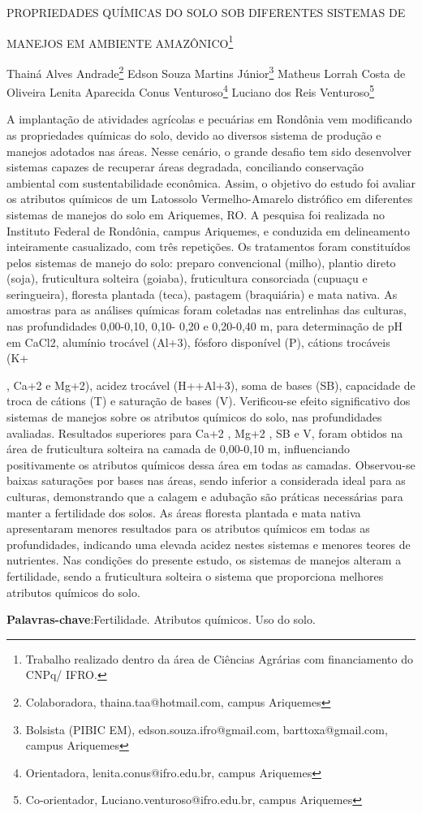 \documentclass[article,12pt,onesidea,4paper,english,brazil]{abntex2}
\begin{document}
	
	
	\frenchspacing 
	
	\begin{center}
		\LARGE PROPRIEDADES QUÍMICAS DO SOLO SOB DIFERENTES SISTEMAS DE
		
		MANEJOS EM AMBIENTE AMAZÔNICO\footnote{Trabalho realizado dentro da área de Ciências Agrárias com financiamento do CNPq/ IFRO.}
		
		\normalsize
		Thainá Alves Andrade\footnote{Colaboradora, thaina.taa@hotmail.com, campus Ariquemes} 
		Edson Souza Martins Júnior\footnote{Bolsista (PIBIC EM), edson.souza.ifro@gmail.com, barttoxa@gmail.com, campus Ariquemes} 
		Matheus Lorrah Costa de Oliveira 
		Lenita Aparecida Conus Venturoso\footnote{Orientadora, lenita.conus@ifro.edu.br, campus Ariquemes} 
		Luciano dos Reis Venturoso\footnote{Co-orientador, Luciano.venturoso@ifro.edu.br, campus Ariquemes}
	\end{center}
	
	\noindent A implantação de atividades agrícolas e pecuárias em Rondônia vem modificando as
	propriedades químicas do solo, devido ao diversos sistema de produção e manejos
	adotados nas áreas. Nesse cenário, o grande desafio tem sido desenvolver sistemas
	capazes de recuperar áreas degradada, conciliando conservação ambiental com
	sustentabilidade econômica. Assim, o objetivo do estudo foi avaliar os atributos
	químicos de um Latossolo Vermelho-Amarelo distrófico em diferentes sistemas de
	manejos do solo em Ariquemes, RO. A pesquisa foi realizada no Instituto Federal de
	Rondônia, campus Ariquemes, e conduzida em delineamento inteiramente
	casualizado, com três repetições. Os tratamentos foram constituídos pelos sistemas
	de manejo do solo: preparo convencional (milho), plantio direto (soja), fruticultura
	solteira (goiaba), fruticultura consorciada (cupuaçu e seringueira), floresta plantada
	(teca), pastagem (braquiária) e mata nativa. As amostras para as análises químicas
	foram coletadas nas entrelinhas das culturas, nas profundidades 0,00-0,10, 0,10-
	0,20 e 0,20-0,40 m, para determinação de pH em CaCl2, alumínio trocável (Al+3),
	fósforo disponível (P), cátions trocáveis (K+
	
	, Ca+2 e Mg+2), acidez trocável (H++Al+3),
	soma de bases (SB), capacidade de troca de cátions (T) e saturação de bases (V).
	Verificou-se efeito significativo dos sistemas de manejos sobre os atributos químicos
	do solo, nas profundidades avaliadas. Resultados superiores para Ca+2
	, Mg+2
	, SB e
	V, foram obtidos na área de fruticultura solteira na camada de 0,00-0,10 m,
	influenciando positivamente os atributos químicos dessa área em todas as camadas.
	Observou-se baixas saturações por bases nas áreas, sendo inferior a considerada
	ideal para as culturas, demonstrando que a calagem e adubação são práticas
	necessárias para manter a fertilidade dos solos. As áreas floresta plantada e mata
	nativa apresentaram menores resultados para os atributos químicos em todas as
	profundidades, indicando uma elevada acidez nestes sistemas e menores teores de
	nutrientes. Nas condições do presente estudo, os sistemas de manejos alteram a
	fertilidade, sendo a fruticultura solteira o sistema que proporciona melhores atributos
	químicos do solo.
	
	\vspace{\onelineskip}
	
	\noindent
	\textbf{Palavras-chave}:Fertilidade. Atributos químicos. Uso do solo.
	
\end{document}
